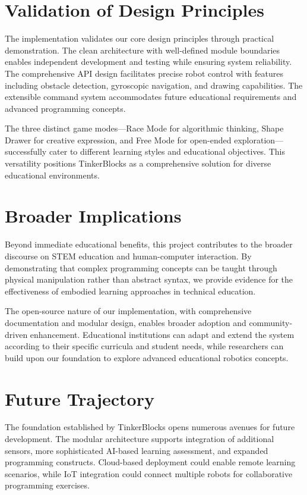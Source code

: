 \section{Validation of Design Principles}

The implementation validates our core design principles through practical demonstration. The clean architecture with well-defined module boundaries enables independent development and testing while ensuring system reliability. The comprehensive API design facilitates precise robot control with features including obstacle detection, gyroscopic navigation, and drawing capabilities. The extensible command system accommodates future educational requirements and advanced programming concepts.

The three distinct game modes---Race Mode for algorithmic thinking, Shape Drawer for creative expression, and Free Mode for open-ended exploration---successfully cater to different learning styles and educational objectives. This versatility positions TinkerBlocks as a comprehensive solution for diverse educational environments.

\section{Broader Implications}

Beyond immediate educational benefits, this project contributes to the broader discourse on STEM education and human-computer interaction. By demonstrating that complex programming concepts can be taught through physical manipulation rather than abstract syntax, we provide evidence for the effectiveness of embodied learning approaches in technical education.

The open-source nature of our implementation, with comprehensive documentation and modular design, enables broader adoption and community-driven enhancement. Educational institutions can adapt and extend the system according to their specific curricula and student needs, while researchers can build upon our foundation to explore advanced educational robotics concepts.

\section{Future Trajectory}

The foundation established by TinkerBlocks opens numerous avenues for future development. The modular architecture supports integration of additional sensors, more sophisticated AI-based learning assessment, and expanded programming constructs. Cloud-based deployment could enable remote learning scenarios, while IoT integration could connect multiple robots for collaborative programming exercises.


